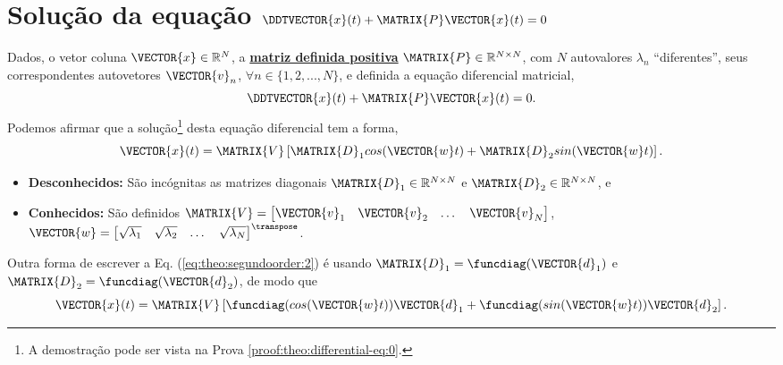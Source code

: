 \section{ Solução da equação $\DDTVECTOR{x}(t) + \MATRIX{P} \VECTOR{x}(t)=0$ }

\begin{theorem}[Equação 
$\DDTVECTOR{x}(t) + \MATRIX{P} \VECTOR{x}(t)=0$ com matriz $\MATRIX{P}$ definida positiva:]
\label{theo:differential-eq:0}
Dados, o vetor coluna $\VECTOR{x} \in \mathbb{R}^N$, 
a \hyperref[def:positivematrix0]{\textbf{matriz definida positiva}} $\MATRIX{P} \in \mathbb{R}^{N\times N}$,
com $N$ autovalores $\lambda_n$ ``diferentes'', seus correspondentes autovetores $\VECTOR{v}_n$,
$\forall n \in \{1, 2, ..., N\}$, 
e definida a equação diferencial matricial,
\begin{equation}\label{eq:theo:segundoorder:1}
\DDTVECTOR{x}(t) + \MATRIX{P} \VECTOR{x}(t)=0.
\end{equation}
Podemos afirmar que a solução\footnote{A
demostração pode ser vista na Prova \ref{proof:theo:differential-eq:0}.} desta equação diferencial tem  a forma,
\begin{equation}\label{eq:theo:segundoorder:2}
 \VECTOR{x}(t)= \MATRIX{V}\left[\MATRIX{D}_1 cos(\VECTOR{w}t) + \MATRIX{D}_2 sin(\VECTOR{w}t) \right].
\end{equation}
\begin{itemize}
\item \textbf{Desconhecidos:} São incógnitas as matrizes diagonais $\MATRIX{D}_1 \in \mathbb{R}^{N \times N}$ e $\MATRIX{D}_2  \in \mathbb{R}^{N \times N}$, e
\item  \textbf{Conhecidos:} São definidos $\MATRIX{V}=
\begin{bmatrix}
\VECTOR{v}_1 & \VECTOR{v}_2 & \dots & \VECTOR{v}_N
\end{bmatrix}$, 
$\VECTOR{w}=
\begin{bmatrix}
\sqrt{\lambda_1} & \sqrt{\lambda_2} & \dots & \sqrt{\lambda_N}
\end{bmatrix}^{\transpose}$.
\end{itemize}
\end{theorem}

\begin{corollary}
\label{coro:differential-eq:0}
Outra forma de escrever a Eq. (\ref{eq:theo:segundoorder:2}) é usando $\MATRIX{D}_1=\funcdiag(\VECTOR{d}_1)$ e $\MATRIX{D}_2=\funcdiag(\VECTOR{d}_2)$, de modo que
\begin{equation}\label{eq:coro:segundoorder:1}
 \VECTOR{x}(t)= \MATRIX{V}\left[ \funcdiag(cos(\VECTOR{w}t))\VECTOR{d}_1 +  \funcdiag(sin(\VECTOR{w}t)) \VECTOR{d}_2 \right].
\end{equation}
\end{corollary}

